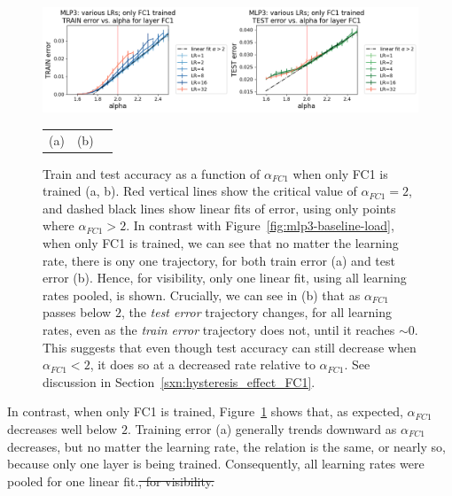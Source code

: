 \begin{figure}[t] %
    \centering
        \includegraphics[width=12cm]{img/alpha_by_scales/mlp3_error_by_LR_FC1_FC1_binned.png}
    \begin{tabular}{ccc}
      (a)\hspace{5cm} & (b) \\
    \end{tabular}
    \caption{
            Train and test accuracy as a function of $\alpha_{FC1}$ when only FC1 is trained (a, b). 
            Red vertical lines show the critical value of $\alpha_{FC1} = 2$, and dashed black lines show 
            linear fits of error, using only points where $\alpha_{FC1} > 2$. 
            In contrast with Figure~\ref{fig:mlp3-baseline-load}, when only 
            FC1 is trained, we can see that no matter the learning rate, there is ony one trajectory, for both train 
            error (a) and test error (b). Hence, for visibility, only one linear fit, using all learning rates pooled, 
            is shown. Crucially, we can see in (b) that as $\alpha_{FC1}$ passes below $2$, the \emph{test error} 
            trajectory changes, for all learning rates, even as the \emph{train error} trajectory does not, until it 
            reaches $\sim 0$. This suggests that even though test accuracy can still decrease when $\alpha_{FC1} < 2$, it 
            does so at a decreased rate relative to $\alpha_{FC1}$. See discussion in 
            Section~\ref{sxn:hysteresis_effect_FC1}.
    }
    \label{fig:mlp3-FC1-alpha-overloaded}
\end{figure}


In contrast, when only FC1 is trained, Figure~\ref{fig:mlp3-FC1-alpha-overloaded} shows that, as expected, 
$\alpha_{FC1}$ decreases well below $2$. Training error (a) generally trends downward as $\alpha_{FC1}$ decreases, 
but no matter the learning rate, the relation is the same, or nearly so, because only one layer is being trained. 
Consequently, all learning rates were pooled for one linear fit.\st{, for visibility. }

